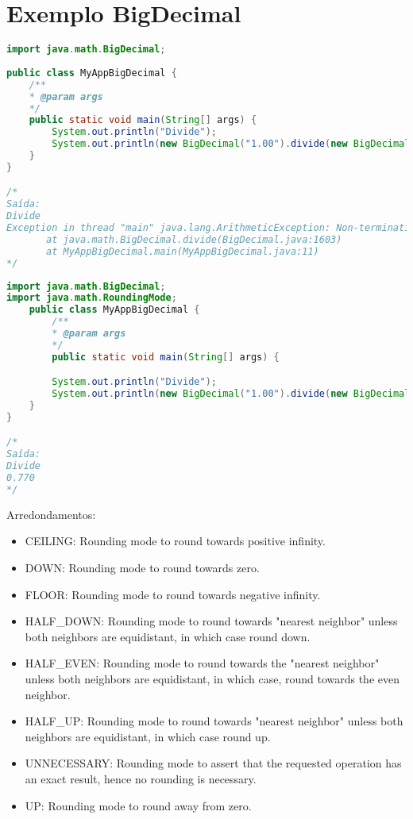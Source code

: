 \documentclass[12pt,a4paper,twoside]{report}
\begin{document}
\section{Exemplo BigDecimal}

\noindent\begin{lstlisting}[caption=Código ERRADO retornando o Exception,language=Java]
import java.math.BigDecimal;
 
public class MyAppBigDecimal { 
    /**
    * @param args
    */
    public static void main(String[] args) {
        System.out.println("Divide");
        System.out.println(new BigDecimal("1.00").divide(new BigDecimal("1.3")));
    }
}

/*
Saída:
Divide
Exception in thread "main" java.lang.ArithmeticException: Non-terminating decimal expansion; no exact representable decimal result.
       at java.math.BigDecimal.divide(BigDecimal.java:1603)
       at MyAppBigDecimal.main(MyAppBigDecimal.java:11)
*/
\end{lstlisting}

\noindent\begin{lstlisting}[caption=Código CERTO retornando o valor arredondado,language=Java]
import java.math.BigDecimal;
import java.math.RoundingMode;
    public class MyAppBigDecimal {
        /**
        * @param args
        */
        public static void main(String[] args) {

        System.out.println("Divide");
        System.out.println(new BigDecimal("1.00").divide(new BigDecimal("1.3"),3,RoundingMode.UP));
    }
}

/*
Saída:
Divide
0.770
*/

\end{lstlisting}

Arredondamentos:

\begin{itemize}
  \item CEILING: Rounding mode to round towards positive infinity.
  \item DOWN: Rounding mode to round towards zero.
  \item FLOOR: Rounding mode to round towards negative infinity.
  \item HALF\_DOWN: Rounding mode to round towards "nearest neighbor" unless both neighbors are equidistant, in which case round down.
  \item HALF\_EVEN: Rounding mode to round towards the "nearest neighbor" unless both neighbors are equidistant, in which case, round towards the even neighbor.
  \item HALF\_UP: Rounding mode to round towards "nearest neighbor" unless both neighbors are equidistant, in which case round up.
  \item UNNECESSARY: Rounding mode to assert that the requested operation has an exact result, hence no rounding is necessary.
  \item UP: Rounding mode to round away from zero.
\end{itemize}
\end{document}
